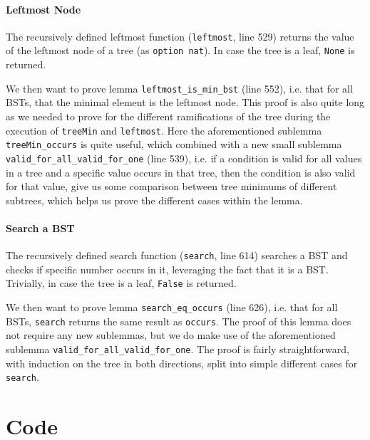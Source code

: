 \documentclass[a4paper]{article}
\begin{document}
\paragraph{Leftmost Node}
The recursively defined leftmost function (\texttt{leftmost}, line 529) returns the value of the leftmost node of a tree (as \texttt{option nat}). In case the tree is a leaf, \texttt{None} is returned.

We then want to prove lemma \texttt{leftmost\_is\_min\_bst} (line 552), i.e. that for all BSTs, that the minimal element is the leftmost node. This proof is also quite long as we needed to prove for the different ramifications of the tree during the execution of \texttt{treeMin} and \texttt{leftmost}. Here the aforementioned sublemma \texttt{treeMin\_occurs} is quite useful, which combined with a new small sublemma \texttt{valid\_for\_all\_valid\_for\_one} (line 539), i.e. if a condition is valid for all values in a tree and a specific value occurs in that tree, then the condition is also valid for that value, give us some comparison between tree minimums of different subtrees, which helps us prove the different cases within the lemma.

\paragraph{Search a BST}
The recursively defined search function (\texttt{search}, line 614) searches a BST and checks if specific number occurs in it, leveraging the fact that it is a BST. Trivially, in case the tree is a leaf, \texttt{False} is returned.

We then want to prove lemma \texttt{search\_eq\_occurs} (line 626), i.e. that for all BSTs, \texttt{search} returns the same result as \texttt{occurs}. The proof of this lemma does not require any new sublemmas, but we do make use of the aforementioned sublemma \texttt{valid\_for\_all\_valid\_for\_one}. The proof is fairly straightforward, with induction on the tree in both directions, split into simple different cases for \texttt{search}.

\newpage
\appendix

\section{Code}


\end{document}

